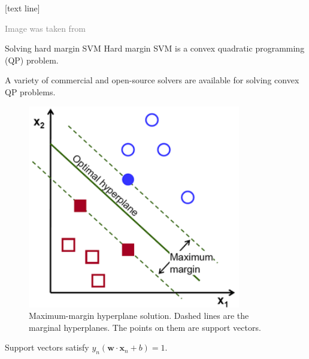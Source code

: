 \documentclass[dvipsnames]{beamer}
\newcommand{\referencefootnote}[1]{\setbeamertemplate{footline}[text line]{%
\parbox{0.9\paperwidth}{\vspace*{-23pt}\tiny{\textcolor{gray}{#1}}\hfill\scriptsize\insertframenumber}}}
\begin{document}
		{ \referencefootnote{Image was taken from \cite{LakshmanNaika2019HandwrittenEC}}
		\begin{frame}{Solving hard margin SVM}
			Hard margin SVM is a convex quadratic programming (QP) problem. \pause
			
			A variety of commercial and open-source solvers are available for solving convex QP problems. \pause
				\begin{figure}
					\center
					\includegraphics[scale=.32]{figures/margin5.png}
           \caption{Maximum-margin hyperplane solution. Dashed lines are the marginal hyperplanes. The points on them are support vectors.}
        \end{figure}
				
				Support vectors satisfy $y_n(\mathbf{w}\cdot\mathbf{x}_n + b)=1$.
			
    \end{frame}
		}
		
\end{document}
